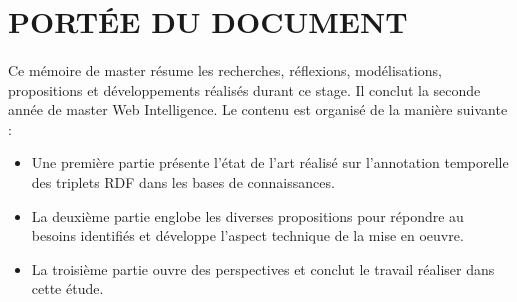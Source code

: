\section*{PORTÉE DU DOCUMENT}
\paragraph{}
Ce mémoire de master résume les recherches, réflexions, modélisations, propositions et développements réalisés durant ce stage. Il conclut la seconde année de master Web Intelligence. Le contenu est organisé de la manière suivante :
\begin{itemize}
\item Une première partie présente l’état de l’art réalisé sur l’annotation temporelle des triplets RDF dans les bases de connaissances.
\item La deuxième partie englobe les diverses propositions pour répondre au besoins identifiés et développe l’aspect technique de la mise en oeuvre.
\item La troisième partie ouvre des perspectives et conclut le travail réaliser dans cette étude.
\end{itemize}